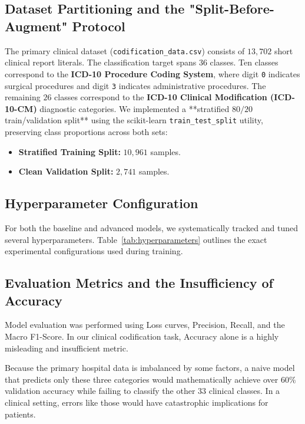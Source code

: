 \documentclass{article}
\begin{document}
\subsection{Dataset Partitioning and the "Split-Before-Augment" Protocol}
The primary clinical dataset (\texttt{codification\_data.csv}) consists of $13,702$ short clinical report literals. The classification target spans $36$ classes. Ten classes correspond to the \textbf{ICD-10 Procedure Coding System}, where digit \texttt{0} indicates surgical procedures and digit \texttt{3} indicates administrative procedures. The remaining $26$ classes  correspond to the \textbf{ICD-10 Clinical Modification (ICD-10-CM)} diagnostic categories.
We implemented a **stratified $80/20$ train/validation split** using the scikit-learn \texttt{train\_test\_split} utility, preserving class proportions across both sets:
\begin{itemize}
    \item \textbf{Stratified Training Split:} $10,961$ samples.
    \item \textbf{Clean Validation Split:} $2,741$ samples.
\end{itemize}


\subsection{Hyperparameter Configuration}
For both the baseline and advanced models, we systematically tracked and tuned several hyperparameters. Table~\ref{tab:hyperparameters} outlines the exact experimental configurations used during training.

\subsection{Evaluation Metrics and the Insufficiency of Accuracy}
Model evaluation was performed using Loss curves, Precision, Recall, and the Macro F1-Score. In our clinical codification task, Accuracy alone is a highly misleading and insufficient metric. 
\vspace{\baselineskip}

Because the primary hospital data is  imbalanced by some factors, a naive model that predicts only these three categories would mathematically achieve over $60\%$ validation accuracy while failing  to classify the other $33$ clinical classes. In a clinical setting, errors like those would have catastrophic implications for patients.
\end{document}
